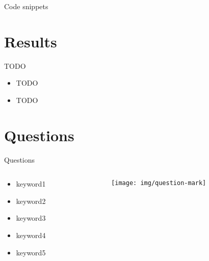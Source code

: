 \documentclass{beamer}
\begin{document}
\begin{frame}{Code snippets}
	
\end{frame}
	
\section{Results}

\begin{frame}{TODO}
	\begin{itemize}
		\item TODO
		\item TODO
	\end{itemize}
\end{frame}

\section{Questions}

\begin{frame}{Questions}
  \begin{columns}
    \begin{column}[l]{0.5\textwidth}
      \begin{itemize}
        \item keyword1
        \item keyword2
        \item keyword3
        \item keyword4
        \item keyword5
      \end{itemize}
    \end{column}
    \begin{column}[c]{0.5\textwidth}
      \begin{figure}
        \texttt{[image: img/question-mark]}
      \end{figure}
    \end{column}
  \end{columns}
\end{frame}
\end{document}
